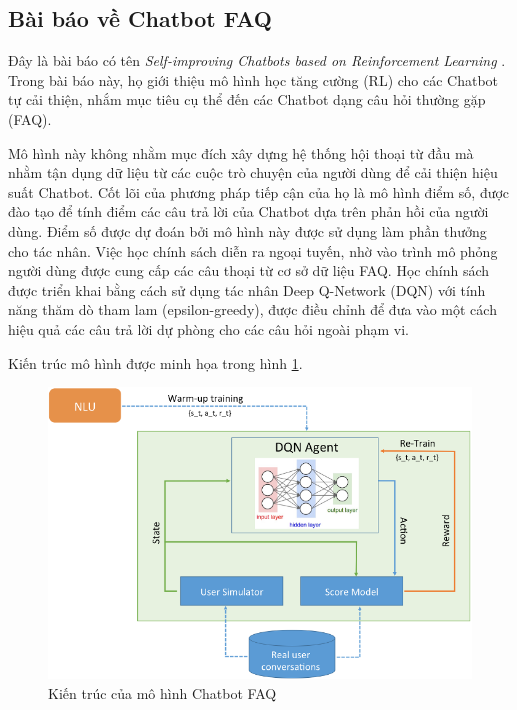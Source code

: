 \subsection{Bài báo về Chatbot FAQ}
Đây là bài báo có tên \textit{Self-improving Chatbots based on Reinforcement Learning} \cite{selfimproving}. Trong bài báo này, họ giới thiệu mô hình học tăng cường (RL) cho các Chatbot tự cải thiện, nhắm mục tiêu cụ thể đến các Chatbot dạng câu hỏi thường gặp (FAQ).

Mô hình này không nhằm mục đích xây dựng hệ thống hội thoại từ đầu mà nhằm tận dụng dữ liệu từ các cuộc trò chuyện của người dùng để cải thiện hiệu suất Chatbot. Cốt lõi của phương pháp tiếp cận của họ là mô hình điểm số, được đào tạo để tính điểm các câu trả lời của Chatbot dựa trên phản hồi của người dùng. Điểm số được dự đoán bởi mô hình này được sử dụng làm phần thưởng cho tác nhân. Việc học chính sách diễn ra ngoại tuyến, nhờ vào trình mô phỏng người dùng được cung cấp các câu thoại từ cơ sở dữ liệu FAQ. Học chính sách được triển khai bằng cách sử dụng tác nhân Deep Q-Network (DQN) với tính năng thăm dò tham lam (epsilon-greedy), được điều chỉnh để đưa vào một cách hiệu quả các câu trả lời dự phòng cho các câu hỏi ngoài phạm vi.

Kiến trúc mô hình được minh họa trong hình \ref{fig:selfimprovingarch}.

\begin{center}
    \begin{figure}[ht!]
        \begin{center}
         \includegraphics[scale=1]{chapter2/img/selfimproving_arch.png}
        \end{center}
        \caption{Kiến trúc của mô hình Chatbot FAQ}
        \label{fig:selfimprovingarch}
    \end{figure}
\end{center}

